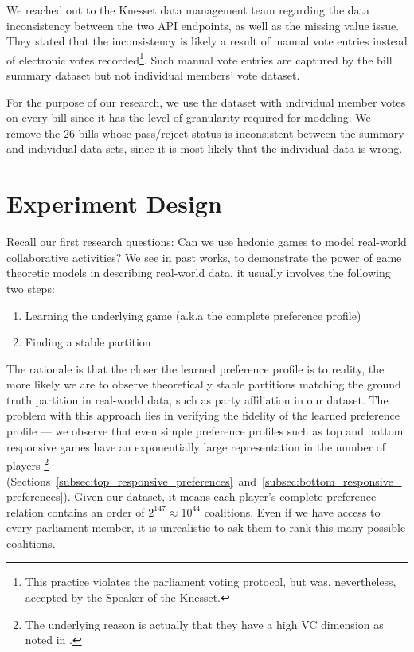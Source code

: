 We reached out to the Knesset data management team regarding the data inconsistency between
the two API endpoints, as well as the missing value issue.
They stated that the inconsistency
is likely a result of manual vote entries instead of electronic votes recorded\footnote{This practice violates the parliament voting protocol, but was, nevertheless, accepted by the Speaker of the Knesset.}.
Such manual vote entries are captured by the bill summary dataset but not individual members' vote dataset.

For the purpose of our research, we use the dataset with individual member
votes on every bill since it has the level of granularity required for modeling.
We remove the 26 bills whose pass/reject status is inconsistent between
the summary and individual data sets, since it is most likely that the individual data is wrong.


\section{Experiment Design}
\label{sec:experiment_design}

Recall our first research questions: Can we use hedonic games to model
real-world collaborative activities?
We see in past works, to demonstrate the power of game theoretic models
in describing real-world data, it usually involves the following two steps:

\begin{enumerate}
  \item Learning the underlying game (a.k.a the complete preference profile)
  \item Finding a stable partition
\end{enumerate}

The rationale is that the closer the learned preference profile is to reality,
the more likely we are to observe theoretically stable partitions matching
the ground truth partition in real-world data, such as party affiliation in
our dataset.
The problem with this approach lies in verifying the fidelity of the learned
preference profile --- we observe that even simple preference profiles such as top
and bottom responsive games have an exponentially large representation in the number of players \footnote{The underlying reason is actually that they have a high VC dimension as noted in \cite{ijcai2017-380}.}
(Sections~\ref{subsec:top_responsive_preferences}~and~\ref{subsec:bottom_responsive_preferences}).
Given our dataset, it means each player's complete preference relation contains
an order of $2^{147} \approx 10^{44}$ coalitions.
Even if we have access to every parliament member, it is unrealistic to ask them
to rank this many possible coalitions.

